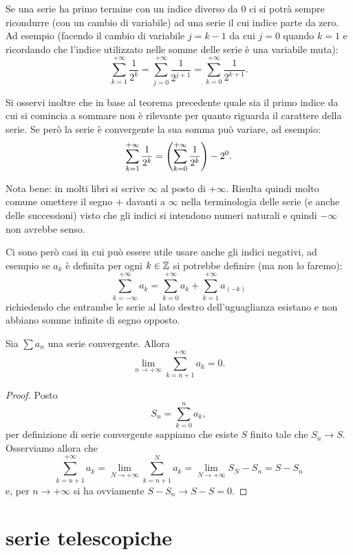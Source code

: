 Se una serie ha
primo termine con un indice diverso da $0$
ci si potrà sempre ricondurre (con un cambio di variabile)
ad una serie il cui indice parte da zero. Ad esempio
(facendo il cambio di variabile $j=k-1$ da cui $j=0$ quando $k=1$
e ricordando che l'indice utilizzato nelle somme delle
serie è una variabile muta):
\[
 \sum_{k=1}^{+\infty} \frac{1}{2^k}
 = \sum_{j=0}^{+\infty} \frac{1}{2^{j+1}}
 = \sum_{k=0}^{+\infty} \frac{1}{2^{k+1}}.
\]

Si osservi inoltre che in base al teorema precedente quale sia il primo indice
da cui si comincia a sommare non è rilevante per quanto riguarda il carattere della serie.
Se però la serie è convergente la sua somma può variare, ad esempio:
\[
 \sum_{k=1}^{+\infty} \frac{1}{2^k}
 = {\left( \sum_{k=0}^{+\infty} \frac{1}{2^k} \right)} - 2^0.
\]

Nota bene: in molti libri si scrive $\infty$ al posto di $+\infty$.
Risulta quindi molto comune omettere il segno $+$ davanti a $\infty$
nella terminologia delle serie (e anche delle successioni) visto
che gli indici si intendono numeri naturali e quindi $-\infty$ non avrebbe
senso.

Ci sono però casi in cui può essere utile usare anche gli indici negativi,
ad esempio
se $a_k$ è definita per ogni $k\in \mathbb Z$
si potrebbe definire (ma non lo faremo):
\[
  \sum_{k=-\infty}^{+\infty} a_k
  = \sum_{k=0}^{+\infty} a_k +
  \sum_{k=1}^{+\infty} a_{(-k)}
\]
richiedendo che entrambe le serie al lato destro
dell'uguaglianza esistano e non abbiano somme infinite di segno opposto.

\begin{theorem}
\label{th:coda}
\mymark{*}
Sia $\sum a_n$ una serie convergente. Allora
\[
  \lim_{n\to +\infty} \sum_{k=n+1}^{+\infty} a_k = 0.
\]
\end{theorem}
%
\begin{proof}
\mymark{*}
Posto
\[
  S_n = \sum_{k=0}^n a_k,
\]
per definizione di serie convergente sappiamo che esiste $S$ finito
tale che $S_n \to S$. Osserviamo allora che
\[
  \sum_{k=n+1}^{+\infty} a_k = \lim_{N\to+\infty} \sum_{k=n+1}^N a_k
   = \lim_{N\to +\infty} S_N - S_n = S - S_n
\]
e, per $n\to +\infty$ si ha ovviamente $S - S_n \to S - S = 0$.
\end{proof}

\section{serie telescopiche}

